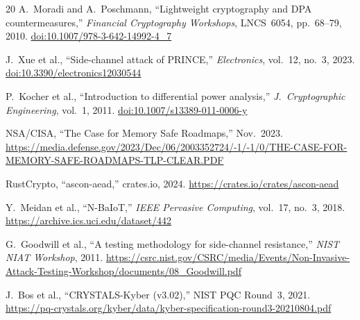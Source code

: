 \documentclass[anonymous]{ndss}
\begin{document}
\begin{thebibliography}{20}
A.~Moradi and A.~Poschmann, ``Lightweight cryptography and DPA countermeasures,''
\textit{Financial Cryptography Workshops}, LNCS~6054, pp.~68--79, 2010.
\href{https://doi.org/10.1007/978-3-642-14992-4_7}{doi:10.1007/978-3-642-14992-4\_7}

J.~Xue et al., ``Side-channel attack of PRINCE,''
\textit{Electronics}, vol.~12, no.~3, 2023.
\href{https://doi.org/10.3390/electronics12030544}{doi:10.3390/electronics12030544}

P.~Kocher et al., ``Introduction to differential power analysis,''
\textit{J.\ Cryptographic Engineering}, vol.~1, 2011.
\href{https://doi.org/10.1007/s13389-011-0006-y}{doi:10.1007/s13389-011-0006-y}

NSA/CISA, ``The Case for Memory Safe Roadmaps,'' Nov.~2023.
\url{https://media.defense.gov/2023/Dec/06/2003352724/-1/-1/0/THE-CASE-FOR-MEMORY-SAFE-ROADMAPS-TLP-CLEAR.PDF}

RustCrypto, ``ascon-aead,'' crates.io, 2024.
\url{https://crates.io/crates/ascon-aead}

Y.~Meidan et al., ``N-BaIoT,'' \textit{IEEE Pervasive Computing},
vol.~17, no.~3, 2018.
\url{https://archive.ics.uci.edu/dataset/442}

G.~Goodwill et al., ``A testing methodology for side-channel resistance,''
\textit{NIST NIAT Workshop}, 2011.
\url{https://csrc.nist.gov/CSRC/media/Events/Non-Invasive-Attack-Testing-Workshop/documents/08_Goodwill.pdf}

J.~Bos et al., ``CRYSTALS-Kyber (v3.02),'' NIST PQC Round~3, 2021.
\url{https://pq-crystals.org/kyber/data/kyber-specification-round3-20210804.pdf}

\end{thebibliography}
\end{document}
